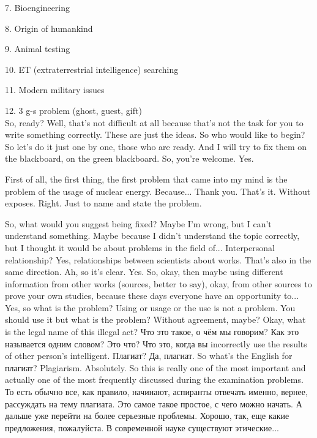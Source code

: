 \documentclass[main.tex]{subfiles}
\begin{document}
7. Bioengineering

8. Origin of humankind

9. Animal testing

10. ET (extraterrestrial intelligence) searching

11. Modern military issues

12. 3 g-s problem (ghost, guest, gift)
\\

So, ready?
Well, that's not difficult at all because that's not the task for you to write something correctly.
These are just the ideas.
So who would like to begin?
So let's do it just one by one, those who are ready.
And I will try to fix them on the blackboard, on the green blackboard.
So, you're welcome.
Yes.

First of all, the first thing, the first problem that came into my mind is the problem of the usage of nuclear energy.
Because... Thank you. That's it. Without exposes. Right. Just to name and state the problem.

So, what would you suggest being fixed?
Maybe I'm wrong, but I can't understand something.
Maybe because I didn't understand the topic correctly, but I thought it would be about problems in the field of... Interpersonal relationship?
Yes, relationships between scientists about works.
That's also in the same direction.
Ah, so it's clear.
Yes.
So, okay, then maybe using different information from other works (sources, better to say), okay, from other sources to prove your own studies, because these days everyone have an opportunity to...
Yes, so what is the problem?
Using or usage or the use is not a problem.
You should use it but what is the problem?
Without agreement, maybe?
Okay, what is the legal name of this illegal act?
Что это такое, о чём мы говорим?
Как это называется одним словом?
Это что?
Что это, когда вы incorrectly use the results of other person's intelligent.
Плагиат?
Да, плагиат.
So what's the English for плагиат?
Plagiarism.
Absolutely.
So this is really one of the most important and actually one of the most frequently discussed during the examination problems.
То есть обычно все, как правило, начинают, аспиранты отвечать именно, вернее, рассуждать на тему плагиата.
Это самое такое простое, с чего можно начать.
А дальше уже перейти на более серьезные проблемы.
Хорошо, так, еще какие предложения, пожалуйста.
В современной науке существуют этические...
\end{document}
